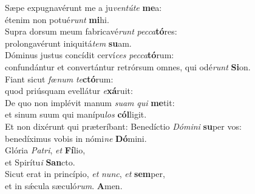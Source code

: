\evenverse Sæpe expugnavérunt me a ju\textit{ven}\textit{tú}\textit{te} \textbf{me}a:~\*\\
\evenverse étenim non potué\textit{runt} \textbf{mi}hi.\\
\oddverse Supra dorsum meum fabricavé\textit{runt} \textit{pec}\textit{ca}\textbf{tó}res:~\*\\
\oddverse prolongavérunt iniquitá\textit{tem} \textbf{su}am.\\
\evenverse Dóminus justus concídit cerví\textit{ces} \textit{pec}\textit{ca}\textbf{tó}rum:~\*\\
\evenverse confundántur et convertántur retrórsum omnes, qui odé\textit{runt} \textbf{Si}on.\\
\oddverse Fiant sicut \textit{fœ}\textit{num} \textit{te}\textbf{ctó}rum:~\*\\
\oddverse quod priúsquam evellátur \textit{e}\textbf{xá}ruit:\\
\evenverse De quo non implévit manum \textit{su}\textit{am} \textit{qui} \textbf{me}tit:~\*\\
\evenverse et sinum suum qui manípu\textit{los} \textbf{cól}ligit.\\
\oddverse Et non dixérunt qui præteríbant: Benedíctio \textit{Dó}\textit{mi}\textit{ni} \textbf{su}per vos:~\*\\
\oddverse benedíximus vobis in nómi\textit{ne} \textbf{Dó}mini.\\
\evenverse Glória \textit{Pa}\textit{tri}, \textit{et} \textbf{Fí}lio,~\*\\
\evenverse et Spirítu\textit{i} \textbf{San}cto.\\
\oddverse Sicut erat in princípio, \textit{et} \textit{nunc}, \textit{et} \textbf{sem}per,~\*\\
\oddverse et in sǽcula sæculó\textit{rum}. \textbf{A}men.\\

